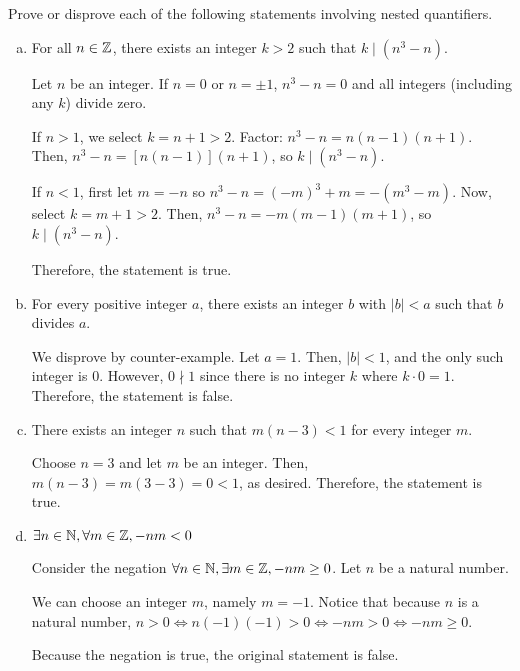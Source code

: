 \begin{recommended}
  Prove or disprove each of the following statements involving nested quantifiers.
\end{recommended}
\begin{enumerate}[(a)]
  \item For all $n \in\mathbb{Z}$, there exists an integer $k > 2$ such that $k \mid (n^3 - n)$.
        \begin{prf}
          Let $n$ be an integer. If $n=0$ or $n=\pm1$, $n^3-n=0$ and all integers (including any $k$) divide zero.

          If $n > 1$, we select $k=n+1 > 2$.
          Factor: $n^3-n = n(n-1)(n+1)$.
          Then, $n^3 - n = [n(n-1)](n+1)$, so $k \mid (n^3-n)$.

          If $n < 1$, first let $m = -n$ so $n^3-n = (-m)^3+m = -(m^3-m)$.
          Now, select $k = m+1 > 2$.
          Then, $n^3 - n = -m(m-1)(m+1)$, so $k \mid (n^3-n)$.

          Therefore, the statement is true.
        \end{prf}

  \item For every positive integer $a$, there exists an integer $b$ with $|b| < a$ such that $b$ divides $a$.
        \begin{prf}
          We disprove by counter-example.
          Let $a = 1$.
          Then, $|b| < 1$, and the only such integer is 0.
          However, $0 \nmid 1$ since there is no integer $k$ where $k \cdot 0 = 1$.
          Therefore, the statement is false.
        \end{prf}

  \item There exists an integer $n$ such that $m(n - 3) < 1$ for every integer $m$.
        \begin{prf}
          Choose $n = 3$ and let $m$ be an integer.
          Then, $m(n-3) = m(3-3) = 0 < 1$, as desired.
          Therefore, the statement is true.
        \end{prf}

  \item $\exists n\in\mathbb{N}, \forall m\in\mathbb{Z}, -nm < 0$
        \begin{prf}
          Consider the negation $\forall n\in\mathbb{N}, \exists m\in\mathbb{Z}, -nm \geq 0$.
          Let $n$ be a natural number.

          We can choose an integer $m$, namely $m=-1$.
          Notice that because $n$ is a natural number, $n > 0 \iff n(-1)(-1) > 0 \iff -nm > 0 \iff -nm \geq 0$.

          Because the negation is true, the original statement is false.
        \end{prf}
\end{enumerate}


